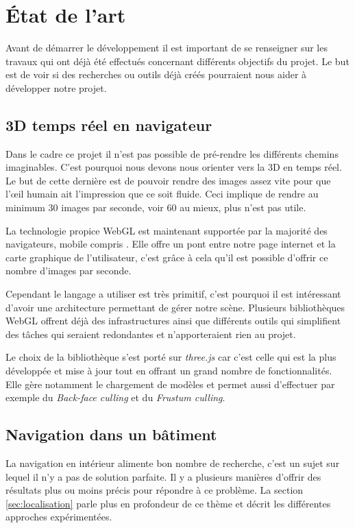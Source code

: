 \section{État de l'art}
Avant de démarrer le développement il est important de se renseigner sur les travaux qui ont déjà été effectués concernant différents objectifs du projet. Le but est de voir si des recherches ou outils déjà créés pourraient nous aider à développer notre projet.


\subsection{3D temps réel en navigateur}
Dans le cadre ce projet il n'est pas possible de pré-rendre les différents chemins imaginables. C'est pourquoi nous devons nous orienter vers la 3D en temps réel. Le but de cette dernière est de pouvoir rendre des images assez vite pour que l'œil humain ait l'impression que ce soit fluide. Ceci implique de rendre au minimum 30 images par seconde, voir 60 au mieux, plus n'est pas utile.

La technologie propice WebGL est maintenant supportée par la majorité des navigateurs, mobile compris \cite{caniuse-webgl}. Elle offre un pont entre notre page internet et la carte graphique de l'utilisateur, c'est grâce à cela qu'il est possible d'offrir ce nombre d'images par seconde. 

Cependant le langage a utiliser est très primitif, c'est pourquoi il est intéressant d'avoir une architecture permettant de gérer notre scène. Plusieurs bibliothèques WebGL offrent déjà des infrastructures ainsi que différents outils qui simplifient des tâches qui seraient redondantes et n'apporteraient rien au projet.

Le choix de la bibliothèque s'est porté sur \emph{three.js}\cite{threejs-website} car c'est celle qui est la plus développée et mise à jour tout en offrant un grand nombre de fonctionnalités. Elle gère notamment le chargement de modèles et permet aussi d'effectuer par exemple du \textit{Back-face culling} et du \textit{Frustum culling}\cite{wiki-HiddenSurfaceDetermination}.


\subsection{Navigation dans un bâtiment}
La navigation en intérieur alimente bon nombre de recherche, c'est un sujet sur lequel il n'y a pas de solution parfaite. Il y a plusieurs manières d'offrir des résultats plus ou moins précis pour répondre à ce problème. La section \ref{sec:localisation} parle plus en profondeur de ce thème et décrit les différentes approches expérimentées.


